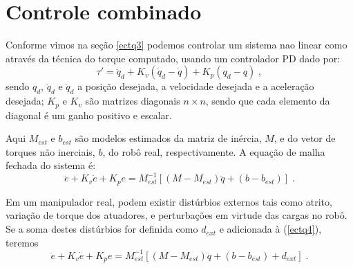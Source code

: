 \section{Controle combinado}
Conforme vimos na seção \ref{ectq3} podemos controlar um sistema nao linear como  através da técnica do torque computado, usando um controlador PD dado por:
\begin{equation} \label{ectq3}
\tau'=\ddot{q}_d+K_v(\dot{q}_d-\dot{q})+K_p(q_d-q) \; ,
\end{equation}
sendo $q_{d}$, $\dot{q}_{d}$ e $\ddot{q}_{d}$ a posição desejada, a velocidade desejada e a aceleração desejada; $K_p$
e $K_v$ são matrizes diagonais $n \times n$, sendo que cada elemento da diagonal é um ganho positivo e escalar.

Aqui $M_{est}$ e $b_{est}$ são modelos estimados da matriz de inércia, $M$, e do vetor de torques não inerciais, $b$, do robô real,  respectivamente. A equação de malha fechada do sistema é:
\begin{equation} \label{ectq4}
\ddot{e}+K_v\dot{e}+K_pe=M_{est}^{-1}[(M-M_{est})\ddot{q}+(b-b_{est})] \; .
\end{equation}

Em um manipulador real, podem existir distúrbios externos tais como atrito, variação de torque dos atuadores, e perturbações em virtude  das cargas no robô. Se a soma destes distúrbios for definida como $d_{ext}$ e adicionada à (\ref{ectq4}), teremos
\begin{equation} \label{ectq5}
\ddot{e}+K_v\dot{e}+K_pe=M_{est}^{-1}[(M-M_{est})\ddot{q}+(b-b_{est})+d_{ext}] \; .
\end{equation}
